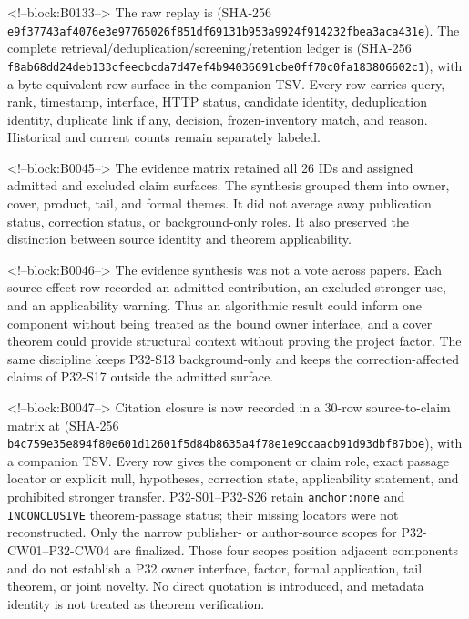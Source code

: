 \documentclass[11pt]{article}
\begin{document}
<!--block:B0133-->
The raw replay is
 (SHA-256
\texttt{e9f37743\allowbreak{}af4076e3\allowbreak{}e9776502\allowbreak{}6f851df6\allowbreak{}9131b953\allowbreak{}a9924f91\allowbreak{}4232fbea\allowbreak{}3aca431e}).  The complete retrieval/deduplication/screening/retention
ledger is 
(SHA-256 \texttt{f8ab68dd\allowbreak{}24deb133\allowbreak{}cfeecbcd\allowbreak{}a7d47ef4\allowbreak{}b9403669\allowbreak{}1cbe0ff7\allowbreak{}0c0fa183\allowbreak{}806602c1}), with a byte-equivalent row surface in the companion
TSV.  Every row carries query, rank, timestamp, interface, HTTP status,
candidate identity, deduplication identity, duplicate link if any, decision,
frozen-inventory match, and reason.  Historical and current counts remain
separately labeled.

<!--block:B0045-->
The evidence matrix retained all 26 IDs and assigned admitted and
excluded claim surfaces. The synthesis grouped them into owner, cover,
product, tail, and formal themes. It did not average away publication
status, correction status, or background-only roles. It also preserved
the distinction between source identity and theorem applicability.

<!--block:B0046-->
The evidence synthesis was not a vote across papers. Each source-effect
row recorded an admitted contribution, an excluded stronger use, and an
applicability warning. Thus an algorithmic result could inform one
component without being treated as the bound owner interface, and a
cover theorem could provide structural context without proving the
project factor. The same discipline keeps P32-S13 background-only and
keeps the correction-affected claims of P32-S17 outside the admitted
surface.

<!--block:B0047-->
Citation closure is now recorded in a 30-row source-to-claim matrix at
 (SHA-256
\texttt{b4c759e3\allowbreak{}5e894f80\allowbreak{}e601d126\allowbreak{}01f5d84b\allowbreak{}8635a4f7\allowbreak{}8e1e9cca\allowbreak{}acb91d93\allowbreak{}dbf87bbe}), with a companion TSV.  Every row gives the component or claim
role, exact passage locator or explicit null, hypotheses, correction state,
applicability statement, and prohibited stronger transfer.  P32-S01--P32-S26
retain \texttt{anchor:none} and \texttt{INCONCLUSIVE} theorem-passage status;
their missing locators were not reconstructed.  Only the narrow publisher- or
author-source scopes for P32-CW01--P32-CW04 are finalized.  Those four scopes
position adjacent components and do not establish a P32 owner interface, factor,
formal application, tail theorem, or joint novelty.  No direct quotation is
introduced, and metadata identity is not treated as theorem verification.
\end{document}
